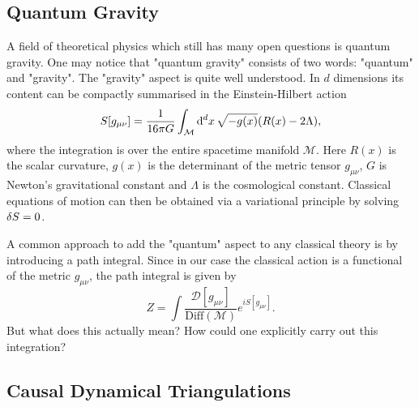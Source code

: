 \subsection{Quantum Gravity}

A field of theoretical physics which still has many open questions is quantum gravity. One may notice that "quantum gravity" consists of two words: "quantum" and "gravity". The "gravity" aspect is quite well understood. In $d$ dimensions its content can be compactly summarised in the Einstein-Hilbert action
\begin{equation}
    S[g_{\mu \nu}]
    =
    \frac{1}{16 \pi G}
    \int_{\mathcal{M}} \dd[d]{x} \sqrt{-g(x)}
    \qty(R(x) - 2 \Lambda)
    ,
\end{equation}
where the integration is over the entire spacetime manifold $\mathcal{M}$. Here $R(x)$ is the scalar curvature, $g(x)$ is the determinant of the metric tensor $g_{\mu \nu}$, $G$ is Newton's gravitational constant and $\Lambda$ is the cosmological constant. Classical equations of motion can then be obtained via a variational principle by solving $\variation{S} = 0$.

A common approach to add the "quantum" aspect to any classical theory is by introducing a path integral. Since in our case the classical action is a functional of the metric $g_{\mu \nu}$, the path integral is given by
\begin{equation}
    Z
    =
    \int \frac{\mathcal{D}[g_{\mu \nu}]}{\text{Diff}(\mathcal{M})}
    e^{i S[g_{\mu \nu}]}
    .
\end{equation}
But what does this actually mean? How could one explicitly carry out this integration?

\subsection{Causal Dynamical Triangulations}

